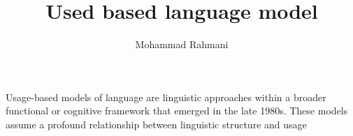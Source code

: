 \documentclass[a4paper]{article}
\title{Used based language model}
\date{}
\author{Mohammad Rahmani}
\begin{document}
\maketitle
    Usage-based models of language are linguistic approaches within a broader functional or cognitive framework that emerged in the late 1980s. These models assume a profound relationship between linguistic structure and usage 
    
    
\end{document}
